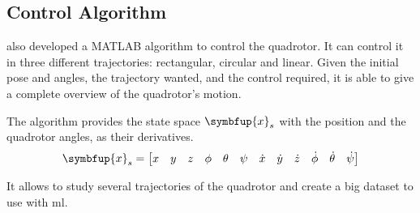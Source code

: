 
\subsection{Control Algorithm}

\citet{geronel2023} also developed a MATLAB algorithm to control the quadrotor. It can control it in three different trajectories: rectangular, circular and linear.
Given the initial pose and angles, the trajectory wanted, and the control required, it is able to give a complete overview of the quadrotor's motion.

The algorithm provides the state space \(\symbfup{x}_s\) with the position and the quadrotor angles, as their derivatives.
%
\begin{equation}\setcounter{MaxMatrixCols}{13}
    \symbfup{x}_s =
    \begin{bmatrix}
        x&y&z&\phi&\theta&\psi&\dot{x}&\dot{y}&\dot{z}&\dot{\phi}&\dot{\theta}&\dot{\psi}
    \end{bmatrix}        
    \label{eq:xs_vector_matlab}
\end{equation}

It allows to study several trajectories of the quadrotor and create a big dataset to use with \gls*{ml}.